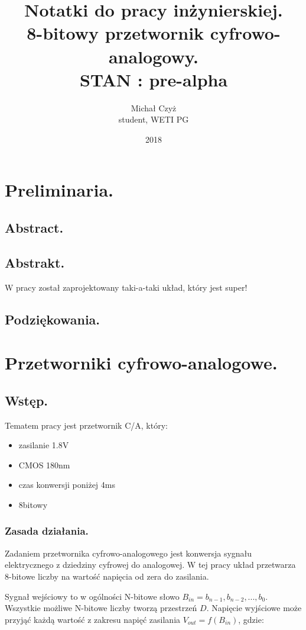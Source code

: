 \documentclass[10pt,a4paper]{report}
\title{Notatki do pracy inżynierskiej. \\ 8-bitowy przetwornik cyfrowo-analogowy. \\ STAN : pre-alpha}
\date{2018}
\author{Michał Czyż \\ student, WETI PG}
\begin{document}
	\maketitle
	
	\tableofcontents
	\newpage
	\chapter{Preliminaria.}
	\section{Abstract.}
	\section{Abstrakt.}
	W pracy został zaprojektowany taki-a-taki układ, który jest super!
	\section{Podziękowania.}
	
	\chapter{Przetworniki cyfrowo-analogowe.}
	\section{Wstęp.}
	Tematem pracy jest przetwornik C/A, który:
	\begin{itemize}
		\item zasilanie 1.8V
		\item CMOS 180nm
		\item czas konwersji poniżej 4ms
		\item 8bitowy
	\end{itemize}

	\subsection{Zasada działania.}
	Zadaniem przetwornika cyfrowo-analogowego jest konwersja sygnału elektrycznego z dziedziny cyfrowej do analogowej. W tej pracy układ przetwarza 8-bitowe liczby na wartość napięcia od zera do zasilania.
	
	Sygnał wejściowy to w ogólności N-bitowe słowo $B_{in}={b_{n-1},b_{n-2},...,b_0}$. Wszystkie możliwe N-bitowe liczby tworzą przestrzeń $D$. Napięcie wyjściowe może przyjąć każdą wartość z zakresu napięć zasilania $V_{out}=f(B_{in})$, gdzie:
\end{document}
